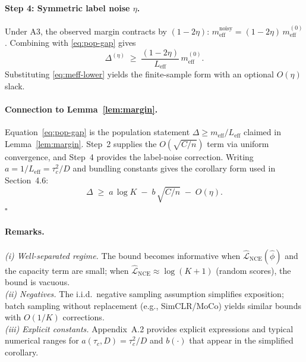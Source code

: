 \documentclass[11pt]{article}
\begin{document}
\paragraph{Step 4: Symmetric label noise $\eta$.}
Under A3, the observed margin contracts by $(1-2\eta)$:
$m_{\mathrm{eff}}^{\text{noisy}}=(1-2\eta)\,m_{\mathrm{eff}}^{(0)}$.
Combining with \eqref{eq:pop-gap} gives
\[
\Delta^{(\eta)} \;\ge\; \frac{(1-2\eta)}{L_{\mathrm{eff}}}\,m_{\mathrm{eff}}^{(0)}.
\]
Substituting \eqref{eq:meff-lower} yields the finite-sample form with an optional $O(\eta)$ slack.

\paragraph{Connection to Lemma~\ref{lem:margin}.}
Equation~\eqref{eq:pop-gap} is the population statement $\Delta \ge m_{\mathrm{eff}}/L_{\mathrm{eff}}$ claimed in Lemma~\ref{lem:margin}. Step~2 supplies the $O(\sqrt{C/n})$ term via uniform convergence, and Step~4 provides the label-noise correction. Writing $a=1/L_{\mathrm{eff}}=\tau_c^2/D$ and bundling constants gives the corollary form used in Section~4.6:
\[
\Delta \;\ge\; a\,\log K \;-\; b\,\sqrt{C/n} \;-\; O(\eta).
\]
\hfill$\square$

\paragraph{Remarks.}
\emph{(i) Well-separated regime.} The bound becomes informative when $\widehat{\mathcal{L}}_{\mathrm{NCE}}(\hat\phi)$ and the capacity term are small; when $\widehat{\mathcal{L}}_{\mathrm{NCE}}\approx \log(K+1)$ (random scores), the bound is vacuous.\\
\emph{(ii) Negatives.} The i.i.d.\ negative sampling assumption simplifies exposition; batch sampling without replacement (e.g., SimCLR/MoCo) yields similar bounds with $O(1/K)$ corrections.\\
\emph{(iii) Explicit constants.} Appendix~A.2 provides explicit expressions and typical numerical ranges for $a(\tau_c,D)=\tau_c^2/D$ and $b(\cdot)$ that appear in the simplified corollary.
\end{document}
